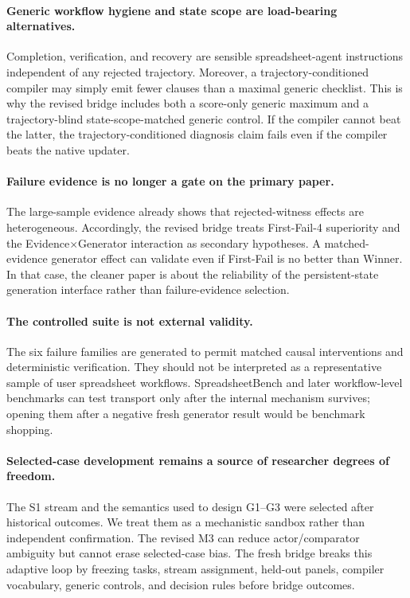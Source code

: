 \paragraph{Generic workflow hygiene and state scope are load-bearing alternatives.}
Completion, verification, and recovery are sensible spreadsheet-agent instructions independent of any rejected trajectory. Moreover, a trajectory-conditioned compiler may simply emit fewer clauses than a maximal generic checklist. This is why the revised bridge includes both a score-only generic maximum and a trajectory-blind state-scope-matched generic control. If the compiler cannot beat the latter, the trajectory-conditioned diagnosis claim fails even if the compiler beats the native updater.

\paragraph{Failure evidence is no longer a gate on the primary paper.}
The large-sample evidence already shows that rejected-witness effects are heterogeneous. Accordingly, the revised bridge treats First-Fail-4 superiority and the Evidence$\times$Generator interaction as secondary hypotheses. A matched-evidence generator effect can validate even if First-Fail is no better than Winner. In that case, the cleaner paper is about the reliability of the persistent-state generation interface rather than failure-evidence selection.

\paragraph{The controlled suite is not external validity.}
The six failure families are generated to permit matched causal interventions and deterministic verification. They should not be interpreted as a representative sample of user spreadsheet workflows. SpreadsheetBench and later workflow-level benchmarks can test transport only after the internal mechanism survives; opening them after a negative fresh generator result would be benchmark shopping.

\paragraph{Selected-case development remains a source of researcher degrees of freedom.}
The S1 stream and the semantics used to design G1--G3 were selected after historical outcomes. We treat them as a mechanistic sandbox rather than independent confirmation. The revised M3 can reduce actor/comparator ambiguity but cannot erase selected-case bias. The fresh bridge breaks this adaptive loop by freezing tasks, stream assignment, held-out panels, compiler vocabulary, generic controls, and decision rules before bridge outcomes.

